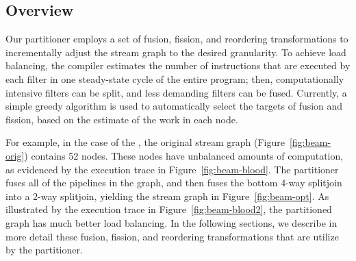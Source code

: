 
\subsection{Overview}

Our partitioner employs a set of fusion, fission, and reordering
transformations to incrementally adjust the stream graph to the
desired granularity.  To achieve load balancing, the compiler
estimates the number of instructions that are executed by each filter
in one steady-state cycle of the entire program; then, computationally
intensive filters can be split, and less demanding filters can be
fused.  Currently, a simple greedy algorithm is used to automatically
select the targets of fusion and fission, based on the estimate of the
work in each node.

For example, in the case of the \BeamFormer, the original stream graph
(Figure~\ref{fig:beam-orig}) contains 52 nodes.  These nodes have
unbalanced amounts of computation, as evidenced by the execution trace
in Figure~\ref{fig:beam-blood}.  The partitioner fuses all of the
pipelines in the graph, and then fuses the bottom 4-way splitjoin into
a 2-way splitjoin, yielding the stream graph in
Figure~\ref{fig:beam-opt}.  As illustrated by the execution trace in
Figure~\ref{fig:beam-blood2}, the partitioned graph has much better
load balancing.  In the following sections, we describe in more detail
these fusion, fission, and reordering transformations that are utilize
by the partitioner.

